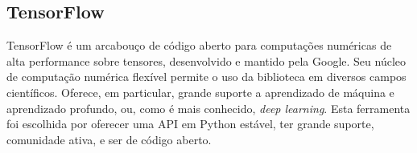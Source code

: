 \subsection{TensorFlow}
\label{sec:tensorflow}

TensorFlow é um arcabouço de código aberto para computações numéricas de alta performance sobre tensores, desenvolvido e mantido pela Google.
Seu núcleo de computação numérica flexível permite o uso da biblioteca em diversos campos científicos.
Oferece, em particular, grande suporte a aprendizado de máquina e aprendizado profundo, ou, como é mais conhecido, \textit{deep learning}.
Esta ferramenta foi escolhida por oferecer uma API em Python estável, ter grande suporte, comunidade ativa, e ser de código aberto.


%

